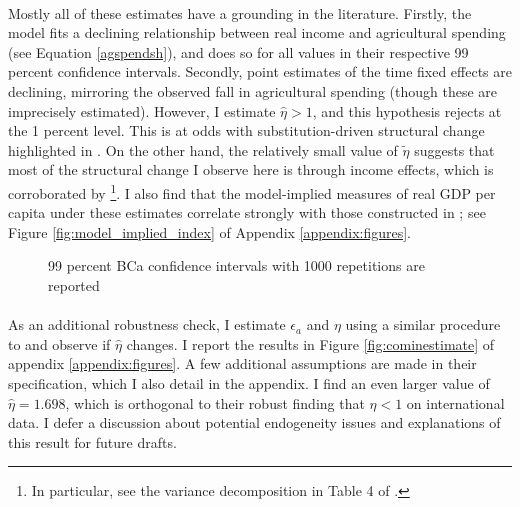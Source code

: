 \documentclass[]{article}
\theoremstyle{plain}
\begin{document}
\paragraph*{}
Mostly all of these estimates have a grounding in the literature. Firstly, the model fits a declining relationship between real income and agricultural spending (see Equation \ref{agspendsh}), and does so for all values in their respective 99 percent confidence intervals. Secondly, point estimates of the time fixed effects are declining, mirroring the observed fall in agricultural spending (though these are imprecisely estimated). However, I estimate $\hat{\eta} > 1$, and this hypothesis rejects at the 1 percent level. This is at odds with substitution-driven structural change highlighted in \cite{ngaipissa}. On the other hand, the relatively small value of $\tilde{\eta}$ suggests that most of the structural change I observe here is through income effects, which is corroborated by \cite{cominetal2021}\footnote{In particular, see the variance decomposition in Table 4 of \cite{cominetal2021}.}. I also find that the model-implied measures of real GDP per capita under these estimates correlate strongly with those constructed in \cite{tombezhu}; see Figure \ref{fig:model_implied_index} of Appendix \ref{appendix:figures}. 
	\begin{figure}[h]
		\small	
		\centering	
	\caption{99 percent BCa confidence intervals with 1000 repetitions are reported}
	\label{fig:estimationresults}
\end{figure}
\paragraph*{}
As an additional robustness check, I estimate $\epsilon_{a}$ and $\eta$ using a similar procedure to \cite{cominetal2021} and observe if $\hat{\eta}$ changes. I report the results in Figure \ref{fig:cominestimate}  of appendix \ref{appendix:figures}. A few additional assumptions are made in their specification, which I also detail in the appendix. I find an even larger value of $\hat{\eta} = 1.698$, which is orthogonal to their robust finding that $\eta < 1$ on international data. I defer a discussion about potential endogeneity issues and explanations of this result for future drafts.  
\end{document}
